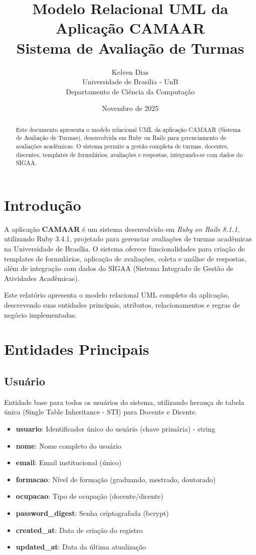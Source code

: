 \documentclass[a4paper,12pt]{article}
\title{Modelo Relacional UML da Aplicação CAMAAR\\
\large Sistema de Avaliação de Turmas}
\author{Kelven Dias\\
Universidade de Brasília - UnB\\
Departamento de Ciência da Computação}
\date{Novembro de 2025}
\begin{document}
 
\maketitle

\begin{abstract}
Este documento apresenta o modelo relacional UML da aplicação CAMAAR (Sistema de Avaliação de Turmas), desenvolvida em Ruby on Rails para gerenciamento de avaliações acadêmicas. O sistema permite a gestão completa de turmas, docentes, discentes, templates de formulários, avaliações e respostas, integrando-se com dados do SIGAA.
\end{abstract}
 
\section{Introdução}

A aplicação \textbf{CAMAAR} é um sistema desenvolvido em \textit{Ruby on Rails 8.1.1}, utilizando Ruby 3.4.1, projetado para gerenciar avaliações de turmas acadêmicas na Universidade de Brasília. O sistema oferece funcionalidades para criação de templates de formulários, aplicação de avaliações, coleta e análise de respostas, além de integração com dados do SIGAA (Sistema Integrado de Gestão de Atividades Acadêmicas).

Este relatório apresenta o modelo relacional UML completo da aplicação, descrevendo suas entidades principais, atributos, relacionamentos e regras de negócio implementadas.
 
\section{Entidades Principais}

\subsection{Usuário}

Entidade base para todos os usuários do sistema, utilizando herança de tabela única (Single Table Inheritance - STI) para Docente e Dicente.

\begin{itemize}
    \item \textbf{usuario}: Identificador único do usuário (chave primária) - string
    \item \textbf{nome}: Nome completo do usuário
    \item \textbf{email}: Email institucional (único)
    \item \textbf{formacao}: Nível de formação (graduando, mestrado, doutorado)
    \item \textbf{ocupacao}: Tipo de ocupação (docente/dicente)
    \item \textbf{password\_digest}: Senha criptografada (bcrypt)
    \item \textbf{created\_at}: Data de criação do registro
    \item \textbf{updated\_at}: Data da última atualização
\end{itemize}
\end{document}
